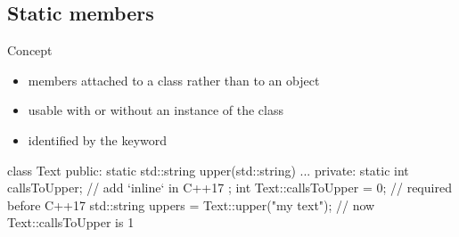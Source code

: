 \subsection[static]{Static members}

\begin{frame}[fragile]
  \begin{block}{Concept}
    \begin{itemize}
    \item members attached to a class rather than to an object
    \item usable with or without an instance of the class
    \item identified by the  keyword
    \end{itemize}
  \end{block}
  \begin{cppcode}
    class Text {
    public:
      static std::string upper(std::string) {...}
    private:
      static int callsToUpper; // add `inline` in C++17
    };
    int Text::callsToUpper = 0; // required before C++17
    std::string uppers = Text::upper("my text");
    // now Text::callsToUpper is 1
  \end{cppcode}
\end{frame}
